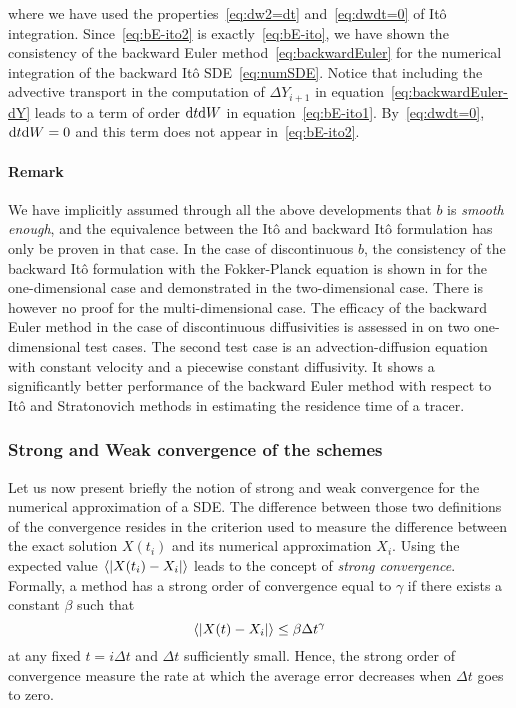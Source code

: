 where we have used the properties~\eqref{eq:dw2=dt} and~\eqref{eq:dwdt=0} of Itô integration. Since~\eqref{eq:bE-ito2} is exactly~\eqref{eq:bE-ito}, we have shown the consistency of the backward Euler method~\eqref{eq:backwardEuler} for the numerical integration of the backward Itô SDE~\eqref{eq:numSDE}. Notice that including the advective transport in the computation of $\Delta Y_{i+1}$ in equation~\eqref{eq:backwardEuler-dY} leads to a term of order $\rm dt \rm dW$ in equation~\eqref{eq:bE-ito1}. By~\eqref{eq:dwdt=0}, $\rm dt \rm dW = 0$ and this term does not appear in~\eqref{eq:bE-ito2}. 

\paragraph{Remark} We have implicitly assumed through all the above developments that $b$ is \textit{smooth enough}, and the equivalence between the Itô and backward Itô formulation has only be proven in that case. In the case of discontinuous $b$, the consistency of the backward Itô formulation with the Fokker-Planck equation is shown in \cite{labolle2000diffusion} for the one-dimensional case and demonstrated in the two-dimensional case. There is however no proof for the multi-dimensional case. The efficacy of the backward Euler method in the case of discontinuous diffusivities is assessed in \cite{spivakovskaya2007backward} on two one-dimensional test cases. The second test case is an advection-diffusion equation with constant velocity and a piecewise constant diffusivity. It shows a significantly better performance of the backward Euler method with respect to Itô and Stratonovich methods in estimating the residence time of a tracer. %
\subsubsection{Strong and Weak convergence of the schemes}
Let us now present briefly the notion of strong and weak convergence for the numerical approximation of a SDE. The difference between those two definitions of the convergence resides in the criterion used to measure the difference between the exact solution $X(t_i)$ and its numerical approximation $X_i$. Using the expected value $\esp{|X(t_i) - X_i|}$ leads to the concept of \textit{strong convergence}. Formally, a method has a strong order of convergence equal to $\gamma$ if there exists a constant $\beta$ such that
\begin{equation}
	\esp{|X(t) - X_i|} \le \beta \Delta t^{\gamma}
\end{equation}
at any fixed $t = i\Delta t$ and $\Delta t$ sufficiently small. Hence, the strong order of convergence measure the rate at which the average error decreases when $\Delta t$ goes to zero.

